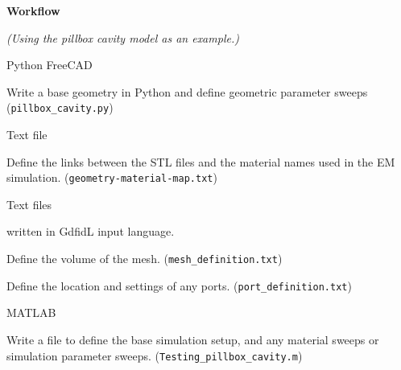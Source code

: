 \documentclass[11pt]{article}
\begin{document}
\begin{center}
\textbf{Workflow}

\emph{(Using the pillbox cavity model as an example.)}
\end{center}
\begin{turn}{45}
\begin{minipage}{0.2\linewidth}
\textcolor[rgb]{0.50,0.50,1.00}{Python FreeCAD}
\end{minipage}
\end{turn}
\begin{minipage}{0.8\linewidth}
Write a base geometry in Python and define geometric parameter sweeps (\verb|pillbox_cavity.py|)
\vspace{10mm}
\end{minipage}

\begin{turn}{45}
\begin{minipage}{0.2\linewidth}
\textcolor[rgb]{0.50,0.50,1.00}{Text file}
\end{minipage}
\end{turn}
\begin{minipage}{0.8\linewidth}
Define the links between the STL files and the material names used in the EM simulation. (\verb|geometry-material-map.txt|)
\vspace{10mm}
\end{minipage}

\begin{turn}{45}
\begin{minipage}{0.2\linewidth}
\textcolor[rgb]{0.50,0.50,1.00}{Text files}

\textcolor[rgb]{0.50,0.50,1.00}{written in GdfidL input language.}
\end{minipage}
\end{turn}
\begin{minipage}{0.6\linewidth}
Define the volume of the mesh. (\verb|mesh_definition.txt|)

Define the location and settings of any ports. (\verb|port_definition.txt|)
\vspace{10mm}
\end{minipage}

\begin{turn}{45}
\begin{minipage}{0.2\linewidth}
\textcolor[rgb]{0.50,0.50,1.00}{MATLAB}
\end{minipage}
\end{turn}
\begin{minipage}{0.8\linewidth}
Write a file to define the base simulation setup, and any material sweeps or simulation parameter sweeps. (\verb|Testing_pillbox_cavity.m|)
\vspace{10mm}
\end{minipage}
\end{document}
